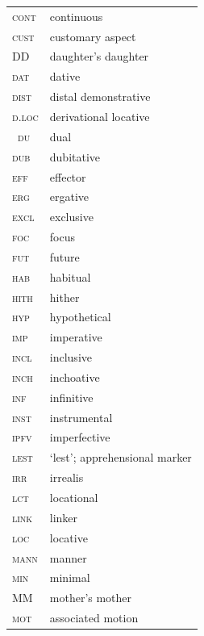 \documentclass[output=paper,colorlinks,citecolor=brown]{langscibook}
\begin{document}
\begin{tabularx}{.5\textwidth}{@{}lQ@{}}
\textsc{cont} & continuous \\
\textsc{cust} & customary aspect \\
DD & daughter's daughter\\
\textsc{dat} & dative\\
\textsc{dist} & distal demonstrative\\
\textsc{d.loc} & derivational locative \\\
\textsc{du} & dual\\
\textsc{dub} & dubitative \\
\textsc{eff} & effector \\
\textsc{erg} & ergative \\
\textsc{excl} & exclusive \\
\textsc{foc} & focus \\
\textsc{fut} & future \\
\textsc{hab} & habitual\\
\textsc{hith} & hither \\
\textsc{hyp} & hypothetical\\
\textsc{imp} & imperative \\
\textsc{incl} & inclusive\\
\textsc{inch} & inchoative \\
\textsc{inf} & infinitive \\
\textsc{inst} & instrumental \\
\textsc{ipfv} & imperfective \\
\textsc{lest} & `lest'; apprehensional marker \\
\textsc{irr} & irrealis \\
\textsc{lct} & locational \\
\textsc{link} &  linker\\
\textsc{loc} & locative \\
\textsc{mann} & manner \\
\textsc{min} & minimal \\
MM & mother's mother\\
\textsc{mot} & associated motion \end{tabularx}
\end{document}
